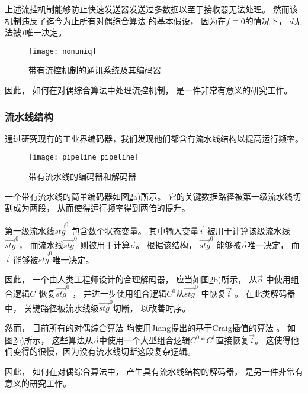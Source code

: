 上述流控机制能够防止快速发送器发送过多数据以至于接收器无法处理。
然而该机制违反了迄今为止所有对偶综合算法
的基本假设，
因为在$f\equiv 0$的情况下，
$d$无法被$I$唯一决定。


\begin{figure}
\centerline{\texttt{[image: nonuniq]}}
\caption{带有流控机制的通讯系统及其编码器}
\label{fig_nonuniq_chap1}
\end{figure}

因此，
如何在对偶综合算法中处理流控机制，
是一件非常有意义的研究工作。

\subsubsection{流水线结构}

通过研究现有的工业界编码器，我们发现他们都含有流水线结构以提高运行频率。
\begin{figure}[b]
\begin{center}
\texttt{[image: pipeline\_pipeline]}
\end{center}
\caption{带有流水线的编码器和解码器}
  \label{fig_pipe_chap1}
\end{figure}

一个带有流水线的简单编码器如图\ref{fig_pipe_chap1}a)所示。
它的关键数据路径被第一级流水线切割成为两段，
从而使得运行频率得到两倍的提升。

第一级流水线$\vec{stg}^0$ 包含数个状态变量。
其中输入变量$\vec{i}$ 被用于计算该级流水线$\vec{stg}^0$，
而流水线$\vec{stg}^0$ 则被用于计算$\vec{o}$。
根据该结构，
$\vec{stg}^0$ 能够被$\vec{o}$唯一决定，
而$\vec{i}$ 能够被$\vec{stg}^0$唯一决定。

因此，
一个由人类工程师设计的合理解码器，
应当如图\ref{fig_pipe_chap1}b)所示，
从$\vec{o}$ 中使用组合逻辑$C^1$恢复$\vec{stg}^0$ ，
并进一步使用组合逻辑$C^0$从$\vec{stg}^0$ 中恢复$\vec{i}$ 。
在此类解码器中，
关键路径被流水线级$\vec{stg}^0$切断，
以改善时序。

然而，
目前所有的对偶综合算法
均使用Jiang提出的基于Craig插值的算法 。
如图\ref{fig_pipe_chap1}c)所示，
这些算法从$\vec{o}$中使用一个大型组合逻辑$C^0*C^1$直接恢复$\vec{i}$。
这使得他们变得的很慢，因为没有流水线切断这段复杂逻辑。

因此，
如何在对偶综合算法中，
产生具有流水线结构的解码器，
是另一件非常有意义的研究工作。



